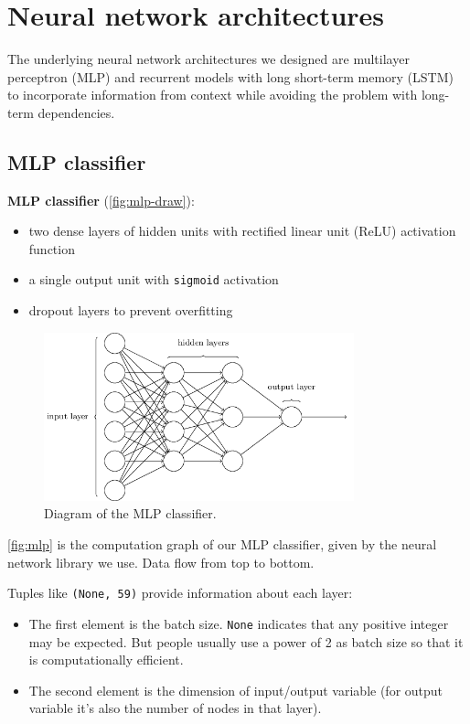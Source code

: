 \documentclass[11pt,a4paper]{report}
\begin{document}
\section{Neural network architectures}

The underlying neural network architectures we designed are multilayer perceptron (MLP) and recurrent models with long short-term memory (LSTM) \parencite{hochreiter1997long} to incorporate information from context while avoiding the problem with long-term dependencies.

\subsection{MLP classifier}

\begin{mdframed}
\noindent \textbf{MLP classifier} (\autoref{fig:mlp-draw}):
\begin{itemize}
  \item two dense layers of hidden units with rectified linear unit (ReLU) activation function
  \item a single output unit with \texttt{sigmoid} activation
  \item dropout layers to prevent overfitting
\end{itemize}
\end{mdframed}

\begin{figure}[htbp]
  \centering
  \includegraphics[width=0.8\textwidth]{mlp.png}
  \caption{Diagram of the MLP classifier.} \label{fig:mlp-draw}
\end{figure}

\autoref{fig:mlp} is the computation graph of our MLP classifier, given by the neural network library we use.
Data flow from top to bottom.

Tuples like \texttt{(None, 59)} provide information about each layer:

\begin{itemize}
  \item The first element is the batch size.
    \texttt{None} indicates that any positive integer may be expected.
    But people usually use a power of 2 as batch size so that it is computationally efficient.
  \item The second element is the dimension of input/output variable (for output variable it's also the number of nodes in that layer).
\end{itemize}
\end{document}
